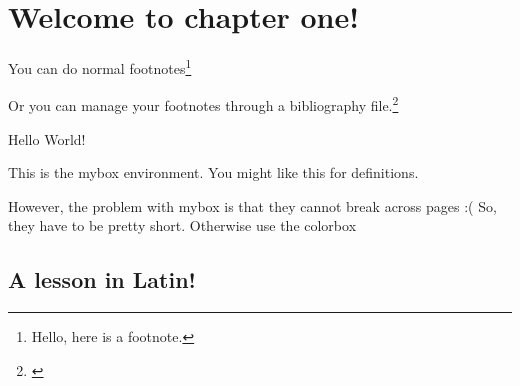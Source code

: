 \chapter{Welcome to chapter one!}
\pagestyle{fancy}

You can do normal footnotes\footnote{Hello, here is a footnote.}

Or you can manage your footnotes through a bibliography file.\footnote{\cite{warren1890right}}

\bigskip

\lipsum[4]

\bigskip

\begin{mybox}{Hello World!}

This is the mybox environment. You might like this for definitions.

However, the problem with mybox is that they cannot break across pages :( So, they have to be pretty short. Otherwise use the colorbox

\end{mybox}

\bigskip

\section{A lesson in Latin!}

\lipsum[5-8]



